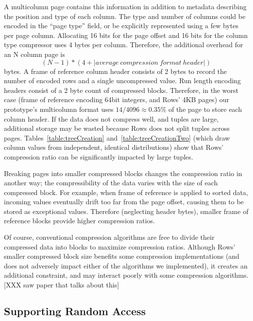 \documentclass{sig-alternate-sigmod08}
\newcommand{\rows}{Rows\xspace}
\newcommand{\rowss}{Rows'\xspace}
\begin{document}
A multicolumn page contains this information in addition to metadata
describing the position and type of each column.  The type and number
of columns could be encoded in the ``page type'' field, or be
explicitly represented using a few bytes per page column.  Allocating
16 bits for the page offset and 16 bits for the column type compressor
uses 4 bytes per column.  Therefore, the additional overhead for an N
column page is
\[
   (N-1) * (4 + |average~compression~format~header|)
\]
bytes.  A frame of reference column header consists of 2 bytes to
record the number of encoded rows and a single uncompressed
value. Run length encoding headers consist of a 2 byte count of
compressed blocks.  Therefore, in the worst case (frame of reference
encoding 64bit integers, and \rowss 4KB pages) our prototype's
multicolumn format uses $14/4096\approx0.35\%$ of the page to store
each column header.  If the data does not compress well, and tuples
are large, additional storage may be wasted because \rows does not
split tuples across pages.  Tables~\ref{table:treeCreation}
and~\ref{table:treeCreationTwo} (which draw column values from
independent, identical distributions) show that \rowss compression
ratio can be significantly impacted by large tuples.


Breaking pages into smaller compressed blocks changes the compression
ratio in another way; the compressibility of the data varies with the
size of each compressed block.  For example, when frame of reference
is applied to sorted data, incoming values eventually drift too far
from the page offset, causing them to be stored as exceptional values.
Therefore (neglecting header bytes), smaller frame of reference blocks
provide higher compression ratios.

Of course, conventional compression algorithms are free to divide
their compressed data into blocks to maximize compression ratios.
Although \rowss smaller compressed block size benefits some
compression implementations (and does not adversely impact either of
the algorithms we implemented), it creates an additional constraint,
and may interact poorly with some compression algorithms. [XXX saw paper that talks about this]

\subsection{Supporting Random Access}
\end{document}
